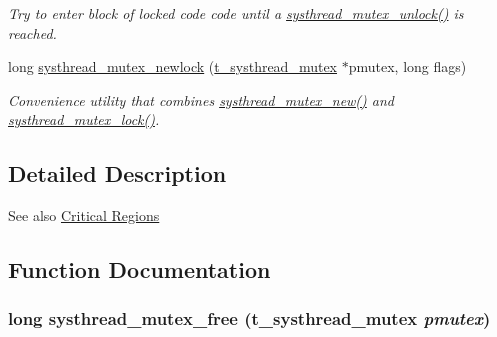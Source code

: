 \begin{DoxyCompactItemize}
\begin{DoxyCompactList}\small\item\em Try to enter block of locked code code until a \hyperlink{group__mutex_ga74aae707e650844be8a4e51a217c9b5f}{systhread\_\-mutex\_\-unlock()} is reached. \item\end{DoxyCompactList}\item 
long \hyperlink{group__mutex_ga57c63515a67e9739aa0f916ae05e8a18}{systhread\_\-mutex\_\-newlock} (\hyperlink{group__threading_ga503de6f3f546ef1dd2bed57a13d9812c}{t\_\-systhread\_\-mutex} $\ast$pmutex, long flags)
\begin{DoxyCompactList}\small\item\em Convenience utility that combines \hyperlink{group__mutex_gaa8cae78764c59883566ac4f861dd534e}{systhread\_\-mutex\_\-new()} and \hyperlink{group__mutex_ga6a3bea4c2f5e5d133d25d78b51fb15bf}{systhread\_\-mutex\_\-lock()}. \item\end{DoxyCompactList}\end{DoxyCompactItemize}


\subsection{Detailed Description}
\begin{DoxySeeAlso}{See also}
\hyperlink{group__critical}{Critical Regions} 
\end{DoxySeeAlso}


\subsection{Function Documentation}
\hypertarget{group__mutex_ga5fdfbb20bfe5b9e6b223436758ea88b1}{
\subsubsection[{systhread\_\-mutex\_\-free}]{\setlength{\rightskip}{0pt plus 5cm}long systhread\_\-mutex\_\-free ({\bf t\_\-systhread\_\-mutex} {\em pmutex})}}
\label{group__mutex_ga5fdfbb20bfe5b9e6b223436758ea88b1}


